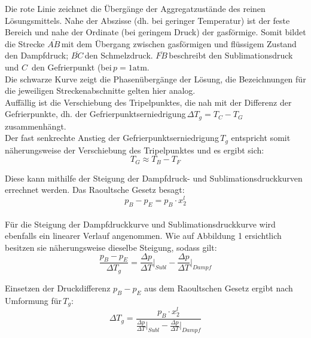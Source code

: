 \documentclass[12pt,a4paper,titlepage,headinclude,bibtotoc]{scrartcl}
\begin{document}
Die rote Linie zeichnet die Übergänge der Aggregatzustände des reinen Lösungsmittels. Nahe der Abszisse (dh. bei geringer Temperatur) ist der feste Bereich und nahe der Ordinate (bei geringem Druck) der gasförmige.
Somit bildet die Strecke $\overline{AB}$\,mit dem Übergang zwischen gasförmigen und flüssigem Zustand den Dampfdruck; $\overline{BC}$\,den Schmelzdruck. $\overline{FB}$\,beschreibt den Sublimationsdruck und $C$\, den Gefrierpunkt (bei\,$p= 1\mathrm{atm}$.\\
Die schwarze Kurve zeigt die Phasenübergänge der Lösung, die Bezeichnungen für die jeweiligen Streckenabschnitte gelten hier analog.\\
Auffällig ist die Verschiebung des Tripelpunktes, die nah mit der Differenz der Gefrierpunkte, dh. der Gefrierpunktserniedrigung\,$\Delta T_g = T_C - T_G$ zusammenhängt. \\
Der fast senkrechte Anstieg der Gefrierpunktserniedrigung\,$T_g$ entspricht somit näherungsweise der Verschiebung des Tripelpunktes und es ergibt sich:  \\

\begin{equation}
T_G \approx T_B - T_F
\end{equation}

Diese kann mithilfe der Steigung der Dampfdruck- und Sublimationsdruckkurven errechnet werden. Das Raoultsche Gesetz besagt:\\

\begin{equation}
p_B - p_E = p_B \cdot x_2^l
\end{equation}
\\

Für die Steigung der Dampfdruckkurve und Sublimationsdruckkurve wird ebenfalls ein linearer Verlauf angenommen. Wie auf Abbildung 1 ersichtlich besitzen sie näherungsweise dieselbe Steigung, sodass gilt:\\

\begin{equation}
\dfrac{p_B - p_E}{\Delta T_g} = \frac{\Delta p}{\Delta T}\bigg \vert_{Subl} - \frac{\Delta p}{\Delta T}\bigg \vert_{Dampf}
\end{equation}

Einsetzen der Druckdifferenz $p_B - p_E$ aus dem Raoultschen Gesetz ergibt nach Umformung für\,$T_g$:\\

\begin{equation}
\Delta T_g =\dfrac{p_B \cdot x_2^l}{\frac{\Delta p}{\Delta T}\bigg \vert_{Subl} - \frac{\Delta p}{\Delta T}\bigg \vert_{Dampf}}
\end{equation}
\\
\end{document}
